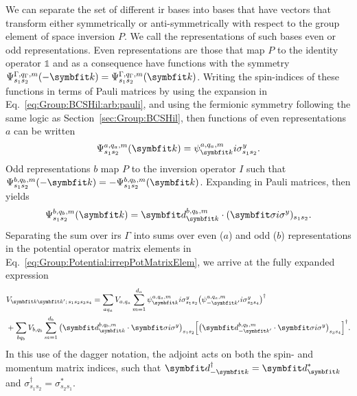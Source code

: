 We can separate the set of different \ac{ir} bases into bases that have vectors that transform either symmetrically or anti-symmetrically
with respect to the group element of space inversion $P$. We call the representations of such bases even or odd representations. Even representations are those that map
$P$ to the identity operator $\mathbb{1}$ and as a consequence have functions with the symmetry $\Psi^{\Gamma,q_\Gamma,m}_{s_1s_2}(-\v{k}) = \Psi^{\Gamma,q_\Gamma,m}_{s_1s_2}(\v{k})$. Writing
the spin-indices of these functions in terms of Pauli matrices by using the expansion in Eq.~\eqref{eq:Group:BCSHil:arb:pauli}, and using the fermionic symmetry
following the same logic as Section~\ref{sec:Group:BCSHil}, then functions of even representations $a$ can be written
\begin{equation}
    \label{eq:Group:Potential:evenIrrepFunctions}
    \Psi^{a,q_a,m}_{s_1s_2}(\v{k}) = \psi^{a,q_a,m}_\v{k}i\sigma^y_{s_1s_2}.
\end{equation}
Odd representations $b$ map $P$ to the inversion operator $I$ such that $\Psi^{b,q_b,m}_{s_1s_2}(-\v{k}) = -\Psi^{b,q_b,m}_{s_1s_2}(\v{k})$. Expanding in Pauli
matrices, then yields
\begin{equation}
    \label{eq:Group:Potential:oddIrrepFunctions}
    \Psi^{b,q_b,m}_{s_1s_2}(\v{k}) = \v{d}^{b,q_b,m}_{\v{k}}\cdot(\v{\sigma}i\sigma^y)_{s_1s_2}.
\end{equation}
Separating the sum over \ac{ir}s $\Gamma$ into sums over even ($a$) and odd ($b$) representations in the potential operator matrix elements in
Eq.~\eqref{eq:Group:Potential:irrepPotMatrixElem}, we arrive at the fully expanded expression
\begin{equation}
    \label{eq:Group:Potential:fullyExpandedPotMatrixElem}
    \begin{split}
        &V_{\v{k}\v{k}';\,s_1s_2s_3s_4} = \sum_{aq_a}V_{a,q_a}\sum_{m=1}^{d_a}\psi_\v{k}^{a,q_a,m}i\sigma^y_{s_1s_2}\big(\psi_{-\v{k}'}^{a,q_a,m}i\sigma^y_{s_3s_4}\big)^\dagger\\
        & + \sum_{bq_b}V_{b,q_b}\sum_{m=1}^{d_b}\big(\v{d}^{b,q_b,m}_{\v{k}}\cdot\v{\sigma}i\sigma^y\big)_{s_1s_2}\Big[\big(\v{d}^{b,q_b,m}_{-\v{k}'}\cdot\v{\sigma}i\sigma^y\big)_{s_3s_4}\Big]^\dagger.
    \end{split}
\end{equation}
In this use of the dagger notation, the adjoint acts on both the spin- and momentum matrix indices, such that
$\v{d}_{-\v{k}}^\dagger = \v{d}_\v{k}^\ast$ and $\sigma_{s_1s_2}^\dagger = \sigma_{s_2s_1}^\ast$.


